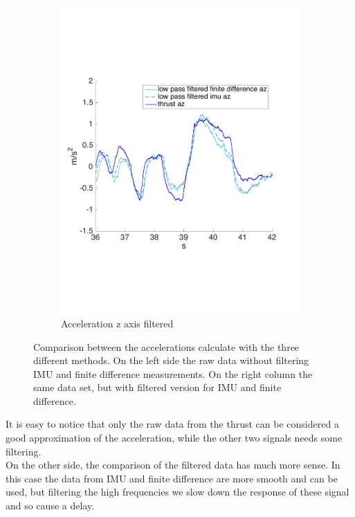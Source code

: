\begin{figure}[!htbp]
\begin{subfigure}[b]{0.45\textwidth}
     \includegraphics[width=\textwidth]{img/acceleration_mass_changed_filtered_z.pdf}
        \caption{Acceleration z axis filtered}
        \label{fig:comparison_accz_fil}
   \end{subfigure}
    \caption{Comparison between the accelerations calculate with the three different methods. On the left side the raw data without filtering IMU and finite difference measurements. On the right column the same data set, but with filtered version for IMU and finite difference.}
    \label{fig:comparison_acc}
\end{figure}

It is easy to notice that only the raw data from the thrust can be considered a good approximation of the acceleration, while the other two signals needs some filtering.\\
On the other side, the comparison of the filtered data has much more sense. In this case the data from IMU and finite difference are more smooth and can be used, but filtering the high frequencies we slow down the response of these signal and so cause a delay.\\

